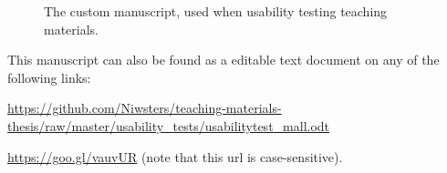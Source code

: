 \begin{figure}[h]
\caption{The custom manuscript, used when usability testing teaching materials.}
\label{app:script}
\end{figure}

This manuscript can also be found as a editable text document on any of the following links:

\url{https://github.com/Niwsters/teaching-materials-thesis/raw/master/usability_tests/usabilitytest_mall.odt}

\url{https://goo.gl/vauvUR} (note that this url is case-sensitive).
